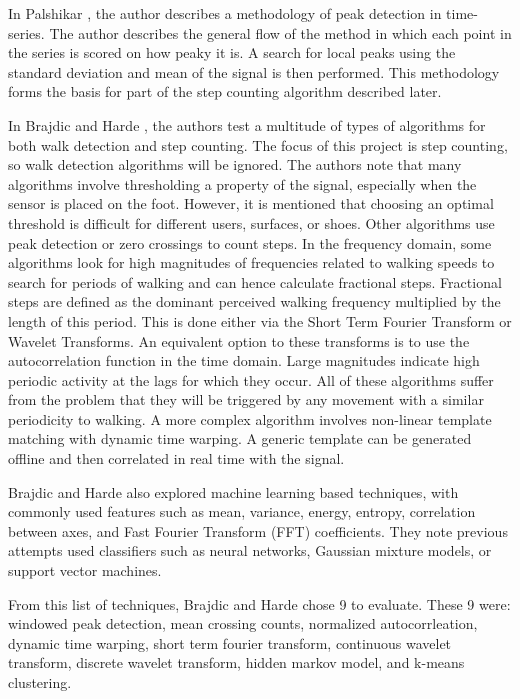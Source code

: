                 In Palshikar \cite{palshikar}, the author describes a methodology of peak detection in time-series. The author describes the general flow of the method in which each point in the series is scored on how peaky it is. A search for local peaks using the standard deviation and mean of the signal is then performed. This methodology forms the basis for part of the step counting algorithm described later.

                In Brajdic and Harde \cite{brajdic}, the authors test a multitude of types of algorithms for both walk detection and step counting. The focus of this project is step counting, so walk detection algorithms will be ignored. The authors note that many algorithms involve thresholding a property of the signal, especially when the sensor is placed on the foot. However, it is mentioned that choosing an optimal threshold is difficult for different users, surfaces, or shoes. Other algorithms use peak detection or zero crossings to count steps. In the frequency domain, some algorithms look for high magnitudes of frequencies related to walking speeds to search for periods of walking and can hence calculate fractional steps. Fractional steps are defined as the dominant perceived walking frequency multiplied by the length of this period. This is done either via the Short Term Fourier Transform or Wavelet Transforms. An equivalent option to these transforms is to use the autocorrelation function in the time domain. Large magnitudes indicate high periodic activity at the lags for which they occur. All of these algorithms suffer from the problem that they will be triggered by any movement with a similar periodicity to walking. A more complex algorithm involves non-linear template matching with dynamic time warping. A generic template can be generated offline and then correlated in real time with the signal. 

                Brajdic and Harde \cite{brajdic} also explored machine learning based techniques, with commonly used features such as mean, variance, energy, entropy, correlation between axes, and Fast Fourier Transform (FFT) coefficients. They note previous attempts used classifiers such as neural networks, Gaussian mixture models, or support vector machines.

                From this list of techniques, Brajdic and Harde \cite{brajdic} chose 9 to evaluate. These 9 were: windowed peak detection, mean crossing counts, normalized autocorrleation, dynamic time warping, short term fourier transform, continuous wavelet transform, discrete wavelet transform, hidden markov model, and k-means clustering. 

